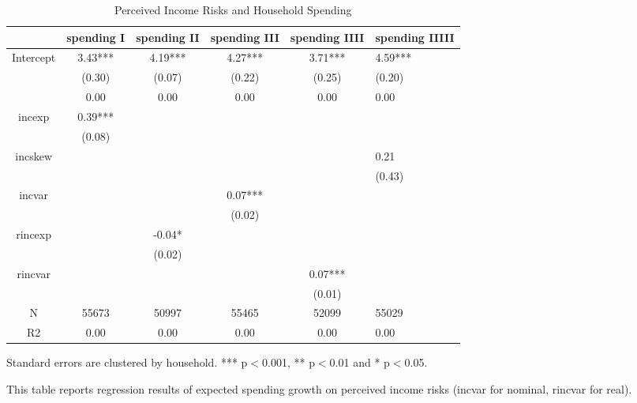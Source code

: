 
\begin{table}[p]
\centering
\begin{adjustbox}{width={0.9\textwidth}}
\begin{threeparttable}
\caption{Perceived Income Risks and Household Spending}
\label{spending_reg}\begin{tabular}{cccccl}
\toprule
{} & spending I & spending II & spending III & spending IIII & spending IIIII \\
\midrule
Intercept &    3.43*** &     4.19*** &      4.27*** &       3.71*** &        4.59*** \\
          &     (0.30) &      (0.07) &       (0.22) &        (0.25) &         (0.20) \\
          &       0.00 &        0.00 &         0.00 &          0.00 &           0.00 \\
incexp    &    0.39*** &             &              &               &                \\
          &     (0.08) &             &              &               &                \\
incskew   &            &             &              &               &           0.21 \\
          &            &             &              &               &         (0.43) \\
incvar    &            &             &      0.07*** &               &                \\
          &            &             &       (0.02) &               &                \\
rincexp   &            &      -0.04* &              &               &                \\
          &            &      (0.02) &              &               &                \\
rincvar   &            &             &              &       0.07*** &                \\
          &            &             &              &        (0.01) &                \\
N         &      55673 &       50997 &        55465 &         52099 &          55029 \\
R2        &       0.00 &        0.00 &         0.00 &          0.00 &           0.00 \\
\bottomrule
\end{tabular}
\begin{tablenotes}\item Standard errors are clustered by household. *** p$<$0.001, ** p$<$0.01 and * p$<$0.05. 
\item This table reports regression results of expected spending growth on perceived income risks (incvar for nominal, rincvar for real).
\end{tablenotes}
\end{threeparttable}
\end{adjustbox}
\end{table}